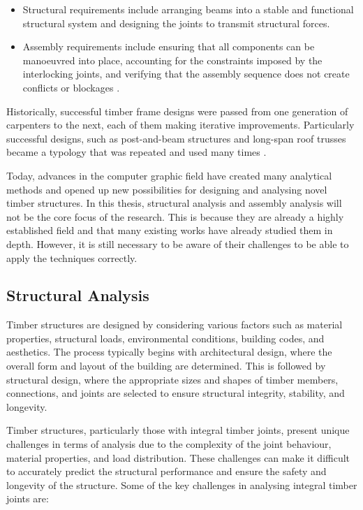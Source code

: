 \begin{itemize}
	\item Structural requirements include arranging beams into a stable and functional structural system and designing the joints to transmit structural forces. 

	\item Assembly requirements include ensuring that all components can be manoeuvred into place, accounting for the constraints imposed by the interlocking joints, and verifying that the assembly sequence does not create conflicts or blockages \parencite{wangStateArtComputational2021}. 

\end{itemize}
Historically, successful timber frame designs were passed from one generation of carpenters to the next, each of them making iterative improvements. Particularly successful designs, such as post-and-beam structures and long-span roof trusses became a typology that was repeated and used many times \parencite{sobonTimberFrameConstruction1984, jacksobonHistoricAmericanTimber2014}.

Today, advances in the computer graphic field have created many analytical methods and opened up new possibilities for designing and analysing novel timber structures. In this thesis, structural analysis and assembly analysis will not be the core focus of the research. This is because they are already a highly established field and that many existing works have already studied them in depth. However, it is still necessary to be aware of their challenges to be able to apply the techniques correctly.

\subsection{Structural Analysis}

Timber structures are designed by considering various factors such as material properties, structural loads, environmental conditions, building codes, and aesthetics. The process typically begins with architectural design, where the overall form and layout of the building are determined. This is followed by structural design, where the appropriate sizes and shapes of timber members, connections, and joints are selected to ensure structural integrity, stability, and longevity.

Timber structures, particularly those with integral timber joints, present unique challenges in terms of analysis due to the complexity of the joint behaviour, material properties, and load distribution. These challenges can make it difficult to accurately predict the structural performance and ensure the safety and longevity of the structure. Some of the key challenges in analysing integral timber joints are:


